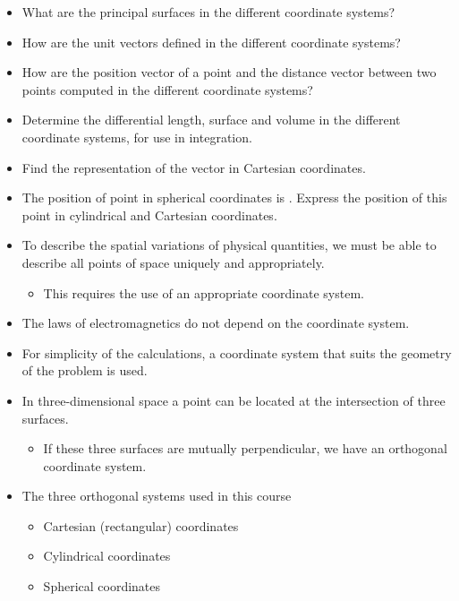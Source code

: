 \begin{ELunit}


\begin{itemize}
\item
  What are the principal surfaces in the different coordinate systems?
\item
  How are the unit vectors defined in the different coordinate systems?
\item
  How are the position vector of a point and the distance vector between two points computed in the different coordinate systems?
\item
  Determine the differential length, surface and volume in the different coordinate systems, for use in integration.
\item
  Find the representation of the vector  in Cartesian coordinates.
\item
  The position of point  in spherical coordinates is . Express the position of this point in cylindrical and Cartesian coordinates.
\item
  To describe the spatial variations of physical quantities, we must be able to describe all points of space uniquely and appropriately.

  \begin{itemize}
  \tightlist
  \item
    This requires the use of an appropriate coordinate system.
  \end{itemize}
\item
  The laws of electromagnetics do not depend on the coordinate system.
\item
  For simplicity of the calculations, a coordinate system that suits the geometry of the problem is used.
\item
  In three-dimensional space a point can be located at the intersection of three surfaces.

  \begin{itemize}
  \tightlist
  \item
    If these three surfaces are mutually perpendicular, we have an orthogonal coordinate system.
  \end{itemize}
\item
  The three orthogonal systems used in this course

  \begin{itemize}
  \tightlist
  \item
    Cartesian (rectangular) coordinates
  \item
    Cylindrical coordinates
  \item
    Spherical coordinates
  \end{itemize}
\end{itemize}

\end{ELunit}

